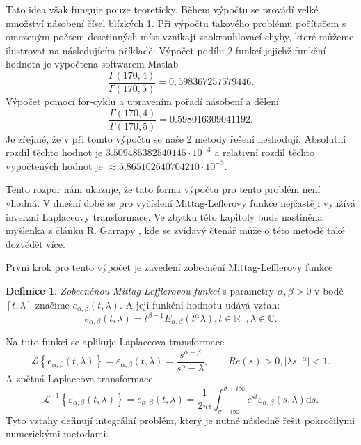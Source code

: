 \documentclass[a4paper,12pt,twoside]{article}
\theoremstyle{definition}
\newtheorem{defin}[veta]{Definice}
\theoremstyle{remark}
\numberwithin{equation}{section}
\numberwithin{table}{section}
\numberwithin{figure}{section}
\newcommand{\dx}[1]{\mathrm{d} #1}
\newcommand{\R}{\mathbb{R}}
\newcommand{\C}{\mathbb{C}}
\begin{document}
Tato idea však funguje pouze teoreticky. Během výpočtu se provádí velké množství násobení čísel blízkých 1. Při výpočtu takového problému počítačem s omezeným počtem desetinných míst vznikají zaokrouhlovací chyby, které můžeme ilustrovat na následujícím příkladě:
Výpočet podílu 2 funkcí jejichž funkční hodnota je vypočtena softwarem Matlab
$$\frac{\Gamma\left(170,4\right)}{\Gamma\left(170,5\right)} = 0,598367257579446.$$
Výpočet pomocí for-cyklu a upravením pořadí násobení a dělení
 $$ \frac{\Gamma\left(170,4\right)}{\Gamma\left(170,5\right)} = 0.598016309041192.$$
 Je zřejmé, že v při tomto výpočtu se naše 2 metody řešení neshodují. Absolutní rozdíl těchto hodnot je $3.509485382540145 \cdot 10^{-3} $ a relativní rozdíl těchto vypočtených hodnot je $\approx 5.865102640704210\cdot 10^{-3}$. 
 
 Tento rozpor nám ukazuje, že tato forma výpočtu pro tento problém není vhodná. V dnešní době se pro vyčíslení Mittag-Leflerovy funkce nejčastěji využívá inverzní Laplaceovy transformace. Ve zbytku této kapitoly bude nastíněna myšlenka z článku R. Garrapy \cite{Garrappa}, kde se zvídavý čtenář může o této metodě také dozvědět více.

První krok pro tento výpočet je zavedení zobecnění Mittag-Lefflerovy funkce
\begin{defin}
	\emph{Zobecněnou Mittag-Lefflerovou funkci} s parametry $\alpha, \beta > 0$ v bodě $\left[t,\lambda \right]$ značíme $e_{\alpha, \beta}\left(t,\lambda\right)$. A její funkční hodnotu udává vztah:
	$$e_{\alpha, \beta}\left(t,\lambda\right) = t^{\beta - 1} E_{\alpha,\beta} \left(t^{\alpha}\lambda\right), t \in \R^{+}, \lambda \in \C.$$
\end{defin}
Na tuto funkci se aplikuje Laplaceova transformace
\begin{equation}
	 \mathcal{L}\left\lbrace e_{\alpha, \beta}\left(t,\lambda\right) \right\rbrace = \varepsilon_{\alpha, \beta} \left(t,\lambda \right)  = \frac{s^{\alpha-\beta}}{s^{\alpha} - \lambda}, \qquad Re(s) > 0, |\lambda s^{-\alpha}|<1.
\end{equation}
A zpětná Laplaceova transformace
\begin{equation}
	\mathcal{L}^{-1} \left\lbrace \varepsilon_{\alpha, \beta} \left(t,\lambda \right) \right\rbrace  = e_{\alpha, \beta}\left(t,\lambda\right) = \frac{1}{2\pi i} \int_{\sigma-i \infty}^{\sigma+i \infty} e^{st}\varepsilon_{\alpha, \beta}\left(s,\lambda\right)\dx s.
\end{equation}
Tyto vztahy definují integrální problém, který je nutné následně řešit pokročilými numerickými metodami.
\end{document}
